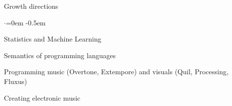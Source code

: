 \documentclass{resume} %
\begin{document}

\begin{rSection}{Growth directions}
  \smallskip
  \begin{list}{$\cdot$}{\leftmargin=0em} %
    \itemsep -0.5em \vspace{-0.5em} %
  \item Statistics and Machine Learning
  \item Semantics of programming languages
  \item Programming music (Overtone, Extempore) and visuals (Quil, Processing, Fluxus)
  \item Creating electronic music
  \end{list}
\end{rSection}

\end{document}
